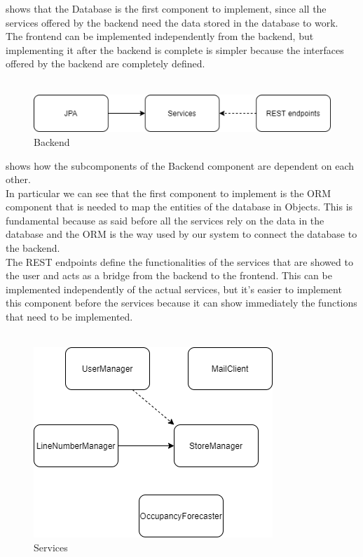  shows that the Database is the first component to implement, since all the services offered by the backend
need the data stored in the database to work. \\
The frontend can be implemented independently from the backend, but implementing it after the backend is complete is simpler because the interfaces
offered by the backend are completely defined.\\
\\
\begin{figure}[H]
    \centering
    \includegraphics{Images/IntegrationAndTestingPlan/Backend.png}
    \caption{Backend}
    \label{fig:Backend}
\end{figure}
 shows how the subcomponents of the Backend component are dependent on each other. \\
In particular we can see that the first component to implement is the ORM component that is needed to map the entities of the database in Objects. This is fundamental because as said before all the services rely on the data in the database and the ORM is
the way used by our system to connect the database to the backend.\\
The REST endpoints define the functionalities of the services that are showed to the user and acts as a bridge from the backend
to the frontend.
This can be implemented independently of the actual services, but it's easier to implement this component before the services because
it can show immediately the functions that need to be implemented.\\
\\
\begin{figure}[H]
    \centering
    \includegraphics[height=0.4\textwidth]{Images/IntegrationAndTestingPlan/Services.png}
    \caption{Services}
    \label{fig:Services}
\end{figure}

